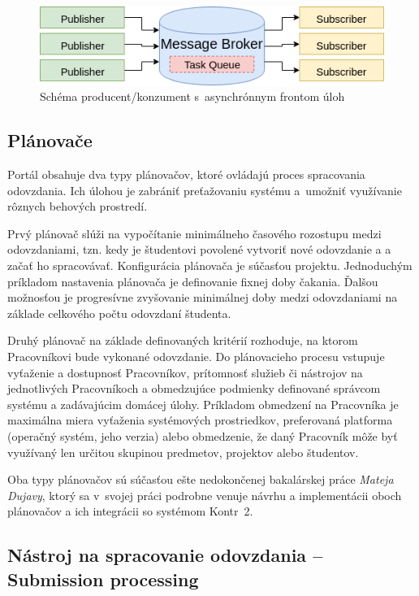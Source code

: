 \documentclass[
  digital, %
  oneside, %
  table,   %
  lof,     %
  lot,   %
]{fithesis3}
\begin{document}
\begin{figure}[!ht]
  \begin{center}
    \includegraphics[width=\textwidth]{imgs/task-queue.png}
  \end{center}
    \caption{Schéma producent/konzument s~asynchrónnym frontom úloh}
    \label{fig:task-queue}
\end{figure}

\subsection{Plánovače}
\label{portal-scheduler}

Portál obsahuje dva typy plánovačov, ktoré ovládajú proces spracovania odovzdania. Ich úlohou je zabrániť preťažovaniu systému a~umožniť využívanie rôznych behových prostredí.

Prvý plánovač slúži na vypočítanie minimálneho časového rozostupu medzi odovzdaniami, tzn. kedy je študentovi povolené vytvoriť nové odovzdanie a a začať ho spracovávať. Konfigurácia plánovača je súčasťou projektu. Jednoduchým príkladom nastavenia plánovača je definovanie fixnej doby čakania. Ďalšou možnosťou je progresívne zvyšovanie minimálnej doby medzi odovzdaniami na základe celkového počtu odovzdaní študenta.

Druhý plánovač na základe definovaných kritérií rozhoduje, na ktorom Pracovníkovi bude vykonané odovzdanie. Do plánovacieho procesu vstupuje vyťaženie a dostupnosť Pracovníkov, prítomnosť služieb či nástrojov na jednotlivých Pracovníkoch a obmedzujúce podmienky definované správcom systému a zadávajúcim domácej úlohy. Príkladom obmedzení na Pracovníka je maximálna miera vyťaženia systémových prostriedkov, preferovaná platforma (operačný systém, jeho verzia) alebo obmedzenie, že daný Pracovník môže byť využívaný len určitou skupinou predmetov, projektov alebo študentov. 

Oba typy plánovačov sú súčasťou ešte nedokončenej bakalárskej práce \emph{Mateja Dujavy}\cite{kontr-scheduler}, ktorý sa v~svojej práci podrobne venuje návrhu a implementácii oboch plánovačov a ich integrácii so systémom Kontr~2.

\subsection{Nástroj na spracovanie odovzdania -- Submission processing}
\end{document}
